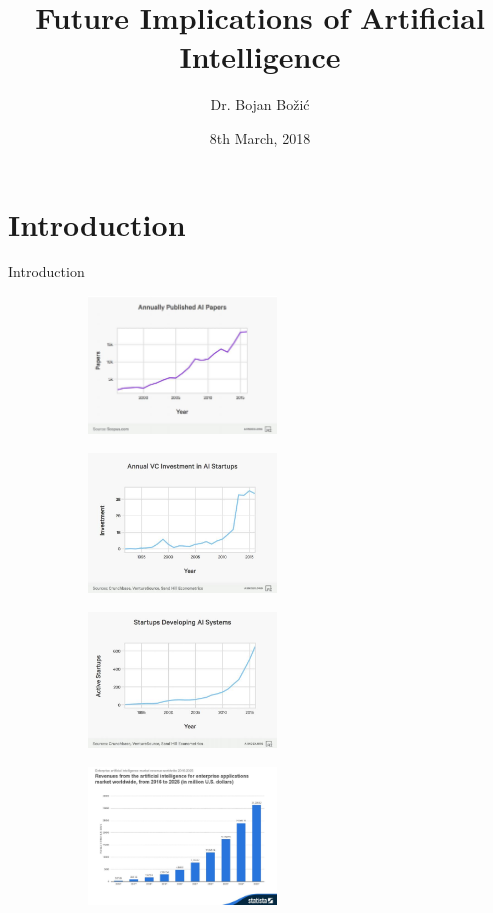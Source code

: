 \documentclass{beamer}
\title[Future AI]{Future Implications of Artificial Intelligence}
\author{Dr. Bojan Bo\v{z}i\'{c}}
\institute{Dublin Institute of Technology}
\date{8th March, 2018}
\begin{document}
\begin{frame}
  \titlepage
\end{frame}

\section{Introduction}
\begin{frame}{Introduction}
\begin{figure}
\centering
\begin{subfigure}{.5\textwidth}
  \centering
  \includegraphics[width=5cm]{figures/annually-published-papers}
\end{subfigure}%
\begin{subfigure}{.5\textwidth}
  \centering
  \includegraphics[width=5cm]{figures/annual-VC-investment-in-AI-startups}
\end{subfigure}
\end{figure}
\begin{figure}
\centering
\begin{subfigure}{.5\textwidth}
  \centering
  \includegraphics[width=5cm]{figures/startups-developing-ai-systems}
\end{subfigure}%
\begin{subfigure}{.5\textwidth}
  \centering
  \includegraphics[width=5cm]{figures/AI-for-enterprise-Apps}
\end{subfigure}
\end{figure}
\end{frame}
\end{document}
